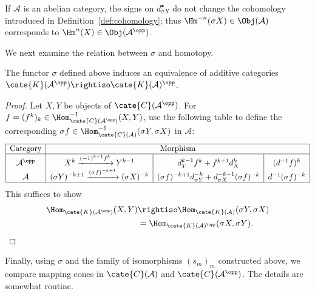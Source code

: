 \begin{remark}\label{rem:sigma-vs-cohomology}
	If $\mathcal{A}$ is an abelian category, the signs on
	$d_{\sigma X}^\bullet$ do not change the cohomology introduced in
	Definition~\ref{def:cohomology}; thus
	$\Hm^{-n}(\sigma X)\in\Obj(\mathcal{A})$ corresponds to
	$\Hm^n(X)\in\Obj(\mathcal{A}^{\opp})$.
\end{remark}

We next examine the relation between $\sigma$ and homotopy.

\begin{proposition}\label{prop:sigma-homotopy}
	The functor $\sigma$ defined above induces an equivalence of additive
	categories
	$\cate{K}(\mathcal{A}^{\opp})\rightiso\cate{K}(\mathcal{A})^{\opp}$.
\end{proposition}
\begin{proof}
	Let $X,Y$ be objects of $\cate{C}(\mathcal{A}^{\opp})$. For
	$f=(f^k)_k\in\Hom^{-1}_{\cate{C}(\mathcal{A}^{\opp})}(X,Y)$, use the
	following table to define the corresponding
	$\sigma f\in\Hom^{-1}_{\cate{C}(\mathcal{A})}(\sigma Y,\sigma X)$ in
	$\mathcal{A}$:
	\begingroup\setlength{\arraycolsep}{4pt}
	\[\begin{array}{|c|c|c|c|} \hline
		\text{Category} & \multicolumn{3}{c|}{\text{Morphism}} \\ \hline
		\mathcal{A}^{\opp} & X^k \xrightarrow{(-1)^{k+1} f^k} Y^{k-1} & d_Y^{k-1} f^k + f^{k+1} d_X^k & (d^{-1}f)^k \\
		\mathcal{A} & (\sigma Y)^{-k+1} \xrightarrow{(\sigma f)^{-k+1}} (\sigma X)^{-k} & (\sigma f)^{-k+1} d_{\sigma Y}^{-k} + d_{\sigma X}^{-k-1} (\sigma f)^{-k} & d^{-1} (\sigma f)^{-k} \\ \hline
	\end{array}\]
	\endgroup
	This suffices to show
	\[\begin{aligned}
		\Hom_{\cate{K}(\mathcal{A}^{\opp})}(X, Y)
		&\rightiso \Hom_{\cate{K}(\mathcal{A})}(\sigma Y, \sigma X) \\
		&= \Hom_{\cate{K}(\mathcal{A})^{\opp}}(\sigma X, \sigma Y).
	\end{aligned}\]
\end{proof}

Finally, using $\sigma$ and the family of isomorphisms $(s_m)_m$ constructed
above, we compare mapping cones in $\cate{C}(\mathcal{A})$ and
$\cate{C}(\mathcal{A}^{\opp})$. The details are somewhat routine.

